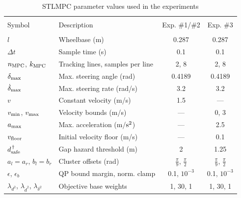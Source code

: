 \documentclass[journal]{IEEEtran}
\begin{document}
\begin{table}[ht]
\caption{STLMPC parameter values used in the experiments}
\label{tab:params}
\vspace{-8pt}
\centering
\begin{tabular}{l@{\hskip 5pt}l@{\hskip 6pt}c@{\hskip 8pt}c}
\toprule\\[-0.85em]
\scriptsize Symbol & \scriptsize Description & \scriptsize Exp. \#1/\#2 & \scriptsize Exp. \#3\\
\midrule\\[-0.85em]
\scriptsize $l$ & \scriptsize Wheelbase (m) & \scriptsize 0.287 & \scriptsize 0.287 \\
\scriptsize $\Delta t$ & \scriptsize Sample time (s) & \scriptsize 0.1 & \scriptsize 0.1 \\
\scriptsize $n_\textup{MPC}$, $k_\textup{MPC}$ & \scriptsize Tracking lines, samples per line & \scriptsize 2, 8 & \scriptsize 2, 8 \\
\scriptsize $\delta_\textup{max}$ & \scriptsize Max. steering angle (rad) & \scriptsize 0.4189 & \scriptsize 0.4189 \\
\scriptsize $\dot\delta_\textup{max}$ & \scriptsize Max. steering rate (rad/s) & \scriptsize 3.2 & \scriptsize 3.2 \\
\scriptsize $v$ & \scriptsize Constant velocity (m/s) & \scriptsize 1.5 & \scriptsize --- \\
\scriptsize $v_\textup{min}$, $v_\textup{max}$ & \scriptsize Velocity bounds (m/s) & \scriptsize --- & \scriptsize 0, 3 \\
\scriptsize $a_\textup{max}$ & \scriptsize Max. acceleration (m/$\textup{s}^2$) & \scriptsize --- & \scriptsize 2.5 \\
\scriptsize $v_\textup{floor}$ & \scriptsize Initial velocity floor (m/s) & \scriptsize --- & \scriptsize 0.1 \\
\scriptsize $d_\textup{safe}^{\,\dagger}$ & \scriptsize Gap hazard threshold (m) & \scriptsize 2 & \scriptsize 1.25 \\
\scriptsize $a_l\!=\!a_r$, $b_l\!=\!b_r$ & \scriptsize Cluster offsets (rad) & \scriptsize $\frac{\pi}{9}$, $\frac{\pi}{2}$ & \scriptsize $\frac{\pi}{9}$, $\frac{\pi}{2}$ \\[0.2em]
\scriptsize $\epsilon$, $\epsilon_b$ & \scriptsize QP bound margin, norm. clamp & \scriptsize 0.1, $10^{-3}$ & \scriptsize 0.1, $10^{-3}$ \\
\scriptsize $\lambda_{d^2}$, $\lambda_{\dot d^2}$, $\lambda_{\delta^2}$ & \scriptsize Objective base weights & \scriptsize 1, 30, 1 & \scriptsize 1, 30, 1 \\

\end{tabular}
\end{table}
\end{document}
